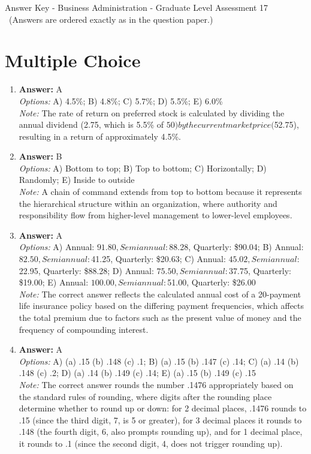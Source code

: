 \documentclass[12pt]{article}
\begin{document}
\begin{center}
Answer Key - Business Administration - Graduate Level Assessment 17 \
\small (Answers are ordered exactly as in the question paper.)
\end{center}

\section*{Multiple Choice}
\begin{enumerate}[label=\arabic*.]
\item \textbf{Answer:} A
\\ \textit{Options:} A) 4.5\%; B) 4.8\%; C) 5.7\%; D) 5.5\%; E) 6.0\%
\\ \textit{Note:} The rate of return on preferred stock is calculated by dividing the annual dividend (2.75, which is 5.5\% of $50) by the current market price ($52.75), resulting in a return of approximately 4.5\%.
\item \textbf{Answer:} B
\\ \textit{Options:} A) Bottom to top; B) Top to bottom; C) Horizontally; D) Randomly; E) Inside to outside
\\ \textit{Note:} A chain of command extends from top to bottom because it represents the hierarchical structure within an organization, where authority and responsibility flow from higher-level management to lower-level employees.
\item \textbf{Answer:} A
\\ \textit{Options:} A) Annual: $91.80, Semiannual: $88.28, Quarterly: \$90.04; B) Annual: $82.50, Semiannual: $41.25, Quarterly: \$20.63; C) Annual: $45.02, Semiannual: $22.95, Quarterly: \$88.28; D) Annual: $75.50, Semiannual: $37.75, Quarterly: \$19.00; E) Annual: $100.00, Semiannual: $51.00, Quarterly: \$26.00
\\ \textit{Note:} The correct answer reflects the calculated annual cost of a 20-payment life insurance policy based on the differing payment frequencies, which affects the total premium due to factors such as the present value of money and the frequency of compounding interest.
\item \textbf{Answer:} A
\\ \textit{Options:} A) (a) .15 (b) .148 (c) .1; B) (a) .15 (b) .147 (c) .14; C) (a) .14 (b) .148 (c) .2; D) (a) .14 (b) .149 (c) .14; E) (a) .15 (b) .149 (c) .15
\\ \textit{Note:} The correct answer rounds the number .1476 appropriately based on the standard rules of rounding, where digits after the rounding place determine whether to round up or down: for 2 decimal places, .1476 rounds to .15 (since the third digit, 7, is 5 or greater), for 3 decimal places it rounds to .148 (the fourth digit, 6, also prompts rounding up), and for 1 decimal place, it rounds to .1 (since the second digit, 4, does not trigger rounding up).

\end{enumerate}
\end{document}
